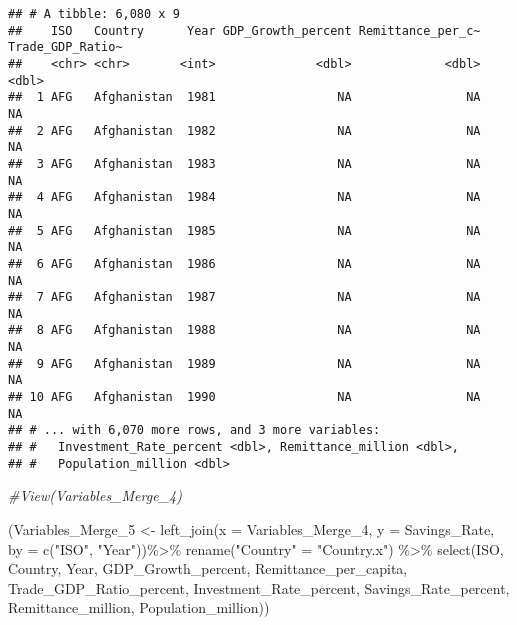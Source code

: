 \documentclass[
]{article}
\newenvironment{Shaded}{\begin{snugshade}}{\end{snugshade}}
\newcommand{\AttributeTok}[1]{\textcolor[rgb]{0.77,0.63,0.00}{#1}}
\newcommand{\CommentTok}[1]{\textcolor[rgb]{0.56,0.35,0.01}{\textit{#1}}}
\newcommand{\FunctionTok}[1]{\textcolor[rgb]{0.00,0.00,0.00}{#1}}
\newcommand{\NormalTok}[1]{#1}
\newcommand{\OtherTok}[1]{\textcolor[rgb]{0.56,0.35,0.01}{#1}}
\newcommand{\SpecialCharTok}[1]{\textcolor[rgb]{0.00,0.00,0.00}{#1}}
\newcommand{\StringTok}[1]{\textcolor[rgb]{0.31,0.60,0.02}{#1}}
\begin{document}
\begin{verbatim}
## # A tibble: 6,080 x 9
##    ISO   Country      Year GDP_Growth_percent Remittance_per_c~ Trade_GDP_Ratio~
##    <chr> <chr>       <int>              <dbl>             <dbl>            <dbl>
##  1 AFG   Afghanistan  1981                 NA                NA               NA
##  2 AFG   Afghanistan  1982                 NA                NA               NA
##  3 AFG   Afghanistan  1983                 NA                NA               NA
##  4 AFG   Afghanistan  1984                 NA                NA               NA
##  5 AFG   Afghanistan  1985                 NA                NA               NA
##  6 AFG   Afghanistan  1986                 NA                NA               NA
##  7 AFG   Afghanistan  1987                 NA                NA               NA
##  8 AFG   Afghanistan  1988                 NA                NA               NA
##  9 AFG   Afghanistan  1989                 NA                NA               NA
## 10 AFG   Afghanistan  1990                 NA                NA               NA
## # ... with 6,070 more rows, and 3 more variables:
## #   Investment_Rate_percent <dbl>, Remittance_million <dbl>,
## #   Population_million <dbl>
\end{verbatim}

\begin{Shaded}
\begin{Highlighting}[]
\CommentTok{\#View(Variables\_Merge\_4)}


\NormalTok{(Variables\_Merge\_5 }\OtherTok{\textless{}{-}} \FunctionTok{left\_join}\NormalTok{(}\AttributeTok{x =}\NormalTok{ Variables\_Merge\_4, }\AttributeTok{y =}\NormalTok{ Savings\_Rate, }\AttributeTok{by =} \FunctionTok{c}\NormalTok{(}\StringTok{"ISO"}\NormalTok{, }\StringTok{"Year"}\NormalTok{))}\SpecialCharTok{\%\textgreater{}\%}
  \FunctionTok{rename}\NormalTok{(}\StringTok{"Country"} \OtherTok{=} \StringTok{"Country.x"}\NormalTok{) }\SpecialCharTok{\%\textgreater{}\%}
  \FunctionTok{select}\NormalTok{(ISO, Country, Year, GDP\_Growth\_percent, Remittance\_per\_capita, Trade\_GDP\_Ratio\_percent, Investment\_Rate\_percent, Savings\_Rate\_percent, Remittance\_million, Population\_million))}
\end{Highlighting}
\end{Shaded}
\end{document}

